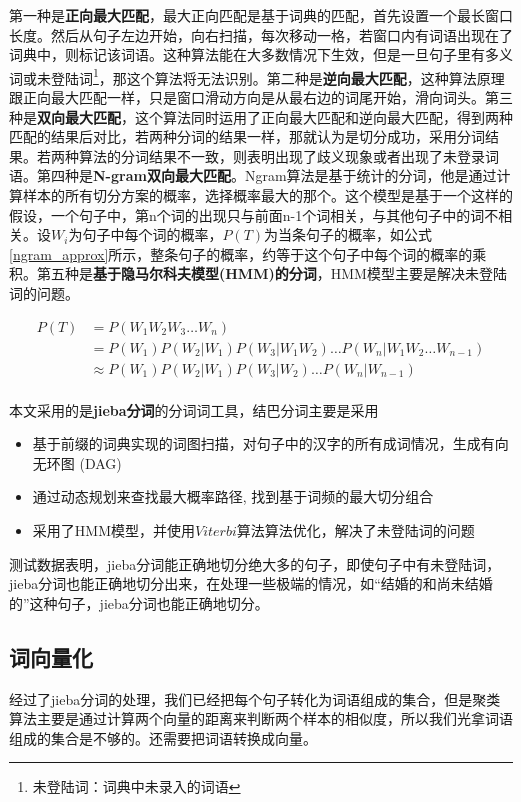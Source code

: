 第一种是\textbf{正向最大匹配}，最大正向匹配是基于词典的匹配，首先设置一个最长窗口长度。然后从句子左边开始，向右扫描，每次移动一格，若窗口内有词语出现在了词典中，则标记该词语。这种算法能在大多数情况下生效，但是一旦句子里有多义词或未登陆词\footnote{\label{unlogin_word}未登陆词：词典中未录入的词语}，那这个算法将无法识别。第二种是\textbf{逆向最大匹配}，这种算法原理跟正向最大匹配一样，只是窗口滑动方向是从最右边的词尾开始，滑向词头。第三种是\textbf{双向最大匹配}，这个算法同时运用了正向最大匹配和逆向最大匹配，得到两种匹配的结果后对比，若两种分词的结果一样，那就认为是切分成功，采用分词结果。若两种算法的分词结果不一致，则表明出现了歧义现象或者出现了未登录词语。第四种是\textbf{N-gram双向最大匹配}。Ngram算法是基于统计的分词，他是通过计算样本的所有切分方案的概率，选择概率最大的那个。这个模型是基于一个这样的假设，一个句子中，第n个词的出现只与前面n-1个词相关，与其他句子中的词不相关。设$W_i$为句子中每个词的概率，$P \left( T \right)$为当条句子的概率，如公式\ref{ngram_approx}所示，整条句子的概率，约等于这个句子中每个词的概率的乘积。第五种是\textbf{基于隐马尔科夫模型(HMM)的分词}，HMM模型主要是解决未登陆词的问题。

\begin{equation}
	\begin{aligned}
		P(T) &= P(W_1W_2W_3…W_n) \\
				&= P(W_1)P(W_2|W_1)P(W_3|W_1W_2)…P(W_n|W_1W_2…W_{n-1}) \\
				&\approx P(W_1)P(W_2|W_1)P(W_3|W_2)…P(W_n|W_{n-1})\\
	\end{aligned}
\label{ngram_approx}
\end{equation}


本文采用的是\textbf{jieba分词}的分词词工具，结巴分词主要是采用
\begin{itemize}
	\item 基于前缀的词典实现的词图扫描，对句子中的汉字的所有成词情况，生成有向无环图 (DAG)
	\item 通过动态规划来查找最大概率路径, 找到基于词频的最大切分组合
	\item 采用了HMM模型，并使用$Viterbi$算法算法优化，解决了未登陆词的问题
\end{itemize}

测试数据表明，jieba分词能正确地切分绝大多的句子，即使句子中有未登陆词，jieba分词也能正确地切分出来，在处理一些极端的情况，如“结婚的和尚未结婚的”这种句子，jieba分词也能正确地切分。


\subsection{词向量化}
经过了jieba分词的处理，我们已经把每个句子转化为词语组成的集合，但是聚类算法主要是通过计算两个向量的距离来判断两个样本的相似度，所以我们光拿词语组成的集合是不够的。还需要把词语转换成向量。

